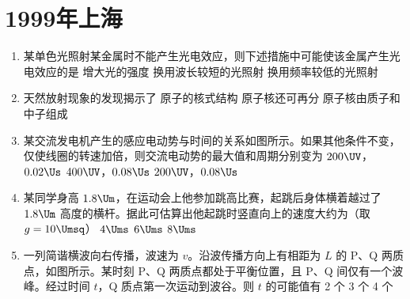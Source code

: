 \documentclass[\gkver]{gaokaozhenti}
\begin{document}
\chapter{1999年上海}

\begin{enumerate}
\item
某单色光照射某金属时不能产生光电效应，则下述措施中可能使该金属产生光电效应的是
{增大光的强度}
{换用波长较短的光照射}
{换用频率较低的光照射}

\item
天然放射现象的发现揭示了
{原子的核式结构}
{原子核还可再分}
{原子核由质子和中子组成}

\item
某交流发电机产生的感应电动势与时间的关系如图所示。如果其他条件不变，仅使线圈的转速加倍，则交流电动势的最大值和周期分别变为
\onepicture[w=6.35cm]{}
{$200\UV$，$0.02\Us$}
{$400\UV$，$0.08\Us$}
{$200\UV$，$0.08\Us$}

\item
某同学身高 $1.8\Um$，在运动会上他参加跳高比赛，起跳后身体横着越过了 $1.8\Um$ 高度的横杆。据此可估算出他起跳时竖直向上的速度大约为（取 $g = 10\Umsq$）
\fourchoices[answer=B]
{$2\Ums$}
{$4\Ums$}
{$6\Ums$}
{$8\Ums$}

\item
一列简谐横波向右传播，波速为 $v$。沿波传播方向上有相距为 $L$ 的 P、Q 两质点，如图所示。某时刻 P、Q 两质点都处于平衡位置，且 P、Q 间仅有一个波峰。经过时间 $t$，Q 质点第一次运动到波谷。则 $t$ 的可能值有
\onepicture[w=5.00cm]{}
{2 个}
{3 个}
{4 个}


\end{enumerate}
\end{document}
